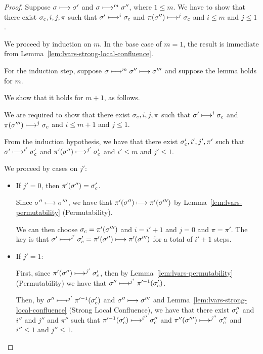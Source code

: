 \begin{proof}
  Suppose $\sigma \longmapsto \sigma'$ and $\sigma \longmapsto^m
  \sigma''$, where $1 \leq m$.  We have to show that there exist
  $\sigma_c, i, j, \pi$ such that $\sigma' \longmapsto^i \sigma_c$ and
  $\pi(\sigma'') \longmapsto^j \sigma_c$ and $i \leq m$ and $j \leq 1$.

  We proceed by induction on $m$.  In the base case of $m = 1$, the
  result is immediate from
  Lemma~\ref{lem:lvars-strong-local-confluence}.

  For the induction step, suppose $\sigma \longmapsto^m \sigma''
  \longmapsto \sigma'''$ and suppose the lemma holds for $m$.

  We show that it holds for $m + 1$, as follows.

  We are required to show that there exist $\sigma_c, i, j, \pi$ such
  that $\sigma' \longmapsto^{i} \sigma_c$ and $\pi(\sigma''')
  \longmapsto^{j} \sigma_c$ and $i \leq m + 1$ and $j \leq 1$.

  From the induction hypothesis, we have that there exist $\sigma_c',
  i', j', \pi'$ such that $\sigma' \longmapsto^{i'} \sigma_c'$ and
  $\pi'(\sigma'') \longmapsto^{j'} \sigma_c'$ and $i' \leq m$ and $j'
  \leq 1$.

  We proceed by cases on $j'$:
  \begin{itemize}

  \item If $j' = 0$, then $\pi'(\sigma'') = \sigma_c'$.

    Since $\sigma'' \longmapsto \sigma'''$, we have that $\pi'(\sigma'')
    \longmapsto \pi'(\sigma''')$ by
    Lemma~\ref{lem:lvars-permutability} (Permutability).

    We can then choose $\sigma_c = \pi'(\sigma''')$ and $i = i' + 1$ and
    $j = 0$ and $\pi = \pi'$.  The key is that $\sigma'
    \longmapsto^{i'} \sigma'_c = \pi'(\sigma'') \longmapsto
    \pi'(\sigma''')$ for a total of $i' + 1$ steps.
    
  \item If $j' = 1$:

    First, since $\pi'(\sigma'') \longmapsto^{j'} \sigma'_c$, then by
    Lemma~\ref{lem:lvars-permutability} (Permutability) we have that
    $\sigma'' \longmapsto^{j'} \pi'^{-1}(\sigma'_c)$.

    Then, by $\sigma'' \longmapsto^{j'} \pi'^{-1}(\sigma'_c)$ and
    $\sigma'' \longmapsto \sigma'''$ and
    Lemma~\ref{lem:lvars-strong-local-confluence} (Strong Local
    Confluence), we have that there exist $\sigma_c''$ and $i''$ and
    $j''$ and $\pi''$ such that $\pi'^{-1}(\sigma'_c)
    \longmapsto^{i''} \sigma_c''$ and $\pi''(\sigma''')
    \longmapsto^{j''} \sigma_c''$ and $i'' \leq 1$ and $j'' \leq 1$.


\end{itemize}
\end{proof}
